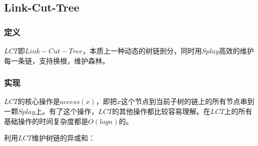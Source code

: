 \documentclass[11pt]{article}
\begin{document}
\subsection{Link-Cut-Tree}
\label{sec-6-6}

\subsubsection{定义}
\label{sec-6-6-1}

\(LCT\)即\(Link-Cut-Tree\)，本质上一种动态的树链剖分，同时用\(Splay\)高效的维护每一条链，支持换根，维护森林。

\subsubsection{实现}
\label{sec-6-6-2}

\(LCT\)的核心操作是\(access(x)\)，即把\(x\)这个节点到当前子树的链上的所有节点串到一颗\(Splay\)上。有了这个操作，\(LCT\)的其他操作都比较容易理解。在\(LCT\)上的所有基础操作的时间复杂度都是\(O(logn)\)的。

利用\(LCT\)维护树链的异或和：
\end{document}
